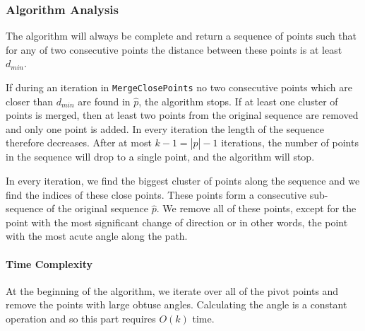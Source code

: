 \begin{algorithm}[]
	\BlankLine


	\BlankLine


	\label{alg:find_corners}
\end{algorithm}

\subsubsection{Algorithm Analysis}

The algorithm will always be complete and return a sequence of points such that for any of two consecutive points the distance between these points is at least $d_{min}$. 

If during an iteration in \texttt{MergeClosePoints} no two consecutive points which are closer than $d_{min}$ are found in $\hat{p}$, the algorithm stops. If at least one cluster of points is merged, then at least two points from the original sequence are removed and only one point is added. In every iteration the length of the sequence therefore decreases. After at most $k-1=|\hat{p}|-1$ iterations, the number of points in the sequence will drop to a single point, and the algorithm will stop.

In every iteration, we find the biggest cluster of points along the sequence and we find the indices of these close points. These points form a consecutive sub-sequence of the original sequence $\hat{p}$. We remove all of these points, except for the point with the most significant change of direction or in other words, the point with the most acute angle along the path.

\paragraph{Time Complexity}

At the beginning of the algorithm, we iterate over all of the pivot points and remove the points with large obtuse angles. Calculating the angle is a constant operation and so this part requires $O(k)$ time.

